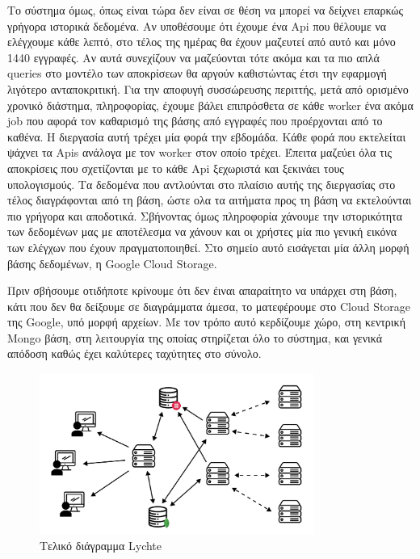 Το σύστημα όμως, όπως είναι τώρα δεν είναι σε θέση να μπορεί να δείχνει επαρκώς γρήγορα ιστορικά δεδομένα. Αν υποθέσουμε ότι έχουμε ένα Api που θέλουμε να ελέγχουμε κάθε
λεπτό, στο τέλος της ημέρας θα έχουν μαζευτεί από αυτό και μόνο 1440 εγγραφές. Αν αυτά συνεχίζουν να μαζεύονται τότε ακόμα και τα πιο απλά queries στο μοντέλο των αποκρίσεων θα αργούν καθιστώντας έτσι την εφαρμογή λιγότερο ανταποκριτική.
Για την αποφυγή συσσώρευσης περιττής, μετά από ορισμένο χρονικό διάστημα, πληροφορίας, έχουμε βάλει επιπρόσθετα σε κάθε worker ένα ακόμα job που αφορά
τον καθαρισμό της βάσης από εγγραφές που προέρχονται από το καθένα. Η διεργασία αυτή τρέχει μία φορά την εβδομάδα. Κάθε φορά που εκτελείται ψάχνει τα Apis ανάλογα με τον worker στον οποίο τρέχει.
Έπειτα μαζεύει όλα τις αποκρίσεις που σχετίζονται με το κάθε Api ξεχωριστά και ξεκινάει τους υπολογισμούς. Τα δεδομένα που αντλούνται στο πλαίσιο αυτής της διεργασίας στο τέλος διαγράφονται από τη βάση, ώστε ολα τα αιτήματα προς τη βάση
να εκτελούνται πιο γρήγορα και αποδοτικά. Σβήνοντας όμως πληροφορία χάνουμε την ιστορικότητα των δεδομένων μας με αποτέλεσμα να χάνουν και οι χρήστες μία πιο γενική εικόνα των ελέγχων που έχουν πραγματοποιηθεί.
Στο σημείο αυτό εισάγεται μία άλλη μορφή βάσης δεδομένων, η Google Cloud Storage.

Πριν σβήσουμε οτιδήποτε κρίνουμε ότι δεν έιναι απαραίτητο να υπάρχει στη βάση, κάτι που δεν θα δείξουμε σε διαγράμματα άμεσα, το ματεφέρουμε στο Cloud Storage της Google, υπό μορφή αρχείων.
Με τον τρόπο αυτό κερδίζουμε χώρο, στη κεντρική Mongo βάση, στη λειτουργία της οποίας στηρίζεται όλο το σύστημα, και γενικά απόδοση καθώς έχει καλύτερες ταχύτητες στο σύνολο.

\begin{figure}[!ht]
	\centering
	\includegraphics[width=0.8\textwidth]{./images/chapter4/lychte-third-implementation-full.png}
	\caption[Τελικό διάγραμμα Lychte]{Τελικό διάγραμμα Lychte}
	\label{fig:lychte_finalised}
\end{figure}


